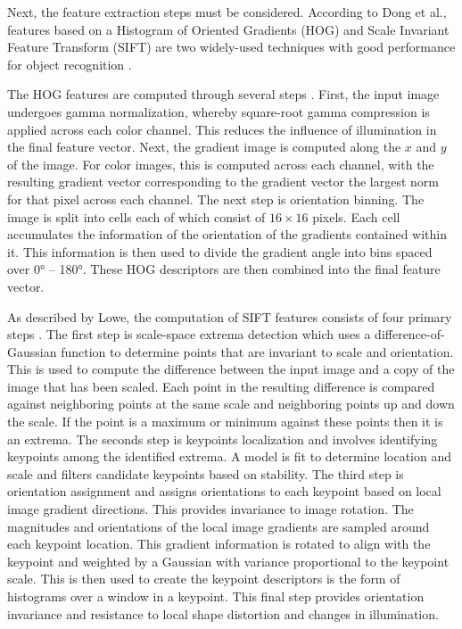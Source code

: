 \documentclass[letterpaper, 10 pt, conference]{conf/ieeeconf}  %
\begin{document}
Next, the feature extraction steps must be considered. According to Dong et al.,
features based on a Histogram of Oriented Gradients (HOG) and Scale Invariant
Feature Transform (SIFT) are two widely-used techniques with good performance
for object recognition \cite{Dong2010}.

The HOG features are computed through several steps \cite{Dalal2005}. First, the
input image undergoes gamma normalization, whereby square-root gamma compression
is applied across each color channel. This reduces the influence of illumination
in the final feature vector. Next, the gradient image is computed along the $x$
and $y$ of the image. For color images, this is computed across each channel,
with the resulting gradient vector corresponding to the gradient vector the
largest norm for that pixel across each channel. The next step is orientation
binning. The image is split into cells each of which consist of $16 \times 16$
pixels. Each cell accumulates the information of the orientation of the
gradients contained within it. This information is then used to divide the
gradient angle into bins spaced over \ang{0} -- \ang{180}. These HOG descriptors
are then combined into the final feature vector.

As described by Lowe, the computation of SIFT features consists of four primary
steps \cite{Lowe2004}. The first step is scale-space extrema detection which
uses a difference-of-Gaussian function to determine points that are invariant to
scale and orientation. This is used to compute the difference between the input
image and a copy of the image that has been scaled. Each point in the resulting
difference is compared against neighboring points at the same scale and
neighboring points up and down the scale. If the point is a maximum or minimum
against these points then it is an extrema. The seconds step is keypoints
localization and involves identifying keypoints among the identified extrema. A
model is fit to determine location and scale and filters candidate keypoints
based on stability. The third step is orientation assignment and assigns
orientations to each keypoint based on local image gradient directions. This
provides invariance to image rotation. The magnitudes and orientations of the
local image gradients are sampled around each keypoint location. This gradient
information is rotated to align with the keypoint and weighted by a Gaussian
with variance proportional to the keypoint scale. This is then used to create
the keypoint descriptors is the form of histograms over a window in a keypoint.
This final step provides orientation invariance and resistance to local shape
distortion and changes in illumination.
\end{document}
